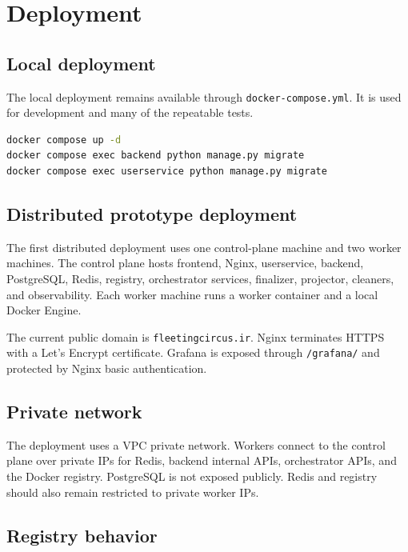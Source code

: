 \documentclass[12pt,a4paper]{report}
\newcommand{\api}[1]{\texttt{#1}}
\newcommand{\file}[1]{\texttt{#1}}
\begin{document}
\clearpage

\chapter{Deployment}

\section{Local deployment}

The local deployment remains available through \file{docker-compose.yml}. It
is used for development and many of the repeatable tests.

\begin{lstlisting}[language=bash,caption={Local stack startup.}]
docker compose up -d
docker compose exec backend python manage.py migrate
docker compose exec userservice python manage.py migrate
\end{lstlisting}

\section{Distributed prototype deployment}

The first distributed deployment uses one control-plane machine and two worker
machines. The control plane hosts frontend, Nginx, userservice, backend,
PostgreSQL, Redis, registry, orchestrator services, finalizer, projector,
cleaners, and observability. Each worker machine runs a worker container and a
local Docker Engine.

The current public domain is \file{fleetingcircus.ir}. Nginx terminates HTTPS
with a Let's Encrypt certificate. Grafana is exposed through
\api{/grafana/} and protected by Nginx basic authentication.

\section{Private network}

The deployment uses a VPC private network. Workers connect to the control
plane over private IPs for Redis, backend internal APIs, orchestrator APIs, and
the Docker registry. PostgreSQL is not exposed publicly. Redis and registry
should also remain restricted to private worker IPs.

\section{Registry behavior}
\end{document}
